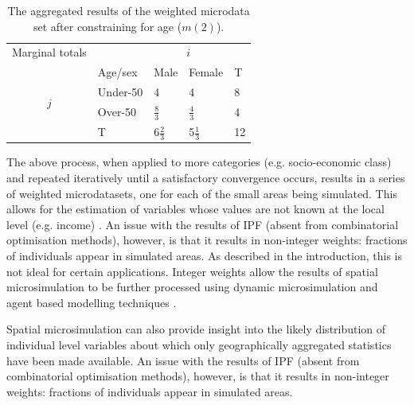 \documentclass[a4paper,10pt]{article}
\begin{document}
\begin{table}[htbp]
\centering
\caption[Aggregated results after constraining for age]{The
aggregated results of the weighted
microdata set after constraining for age ($m(2)$).
}

\begin{tabular}{cllll}\toprule
Marginal totals&  & \multicolumn{2}{c}{$i$} & \\
& Age/sex & Male & Female & T\\ \midrule
\multirow{2}{*}{$j$} & Under-50 & 4 & 4 & 8\\
& Over-50 & $\frac{8}{3}$ & $\frac{4}{3}$ & 4 \\
& T & $6\frac{2}{3}$ & 5$\frac{1}{3}$ & 12\\
\bottomrule
\end{tabular}
\label{t:m2}
\end{table}

The above process, when applied to more categories (e.g. socio-economic class)
and repeated iteratively until a satisfactory convergence occurs, results in a
series of weighted microdatasets, one for each of the small areas being
simulated. This allows for the estimation of variables whose values are not
known at the local level (e.g. income) \citep{Ballas2005c}. An issue
with the results of IPF (absent from combinatorial optimisation methods),
however, is that it results in non-integer weights: fractions of individuals
appear in simulated areas. As described in the introduction, this is not ideal
for certain applications. Integer weights allow the results of spatial
microsimulation to be further processed using dynamic microsimulation and agent
based modelling techniques \citep{Pritchard2012}.

Spatial microsimulation can also provide insight into the likely
distribution of individual level variables about which only
geographically aggregated statistics have been made available.
An issue
with the results of IPF (absent from combinatorial optimisation methods),
however, is that it results in non-integer weights: fractions of individuals
appear in simulated areas.
\end{document}

